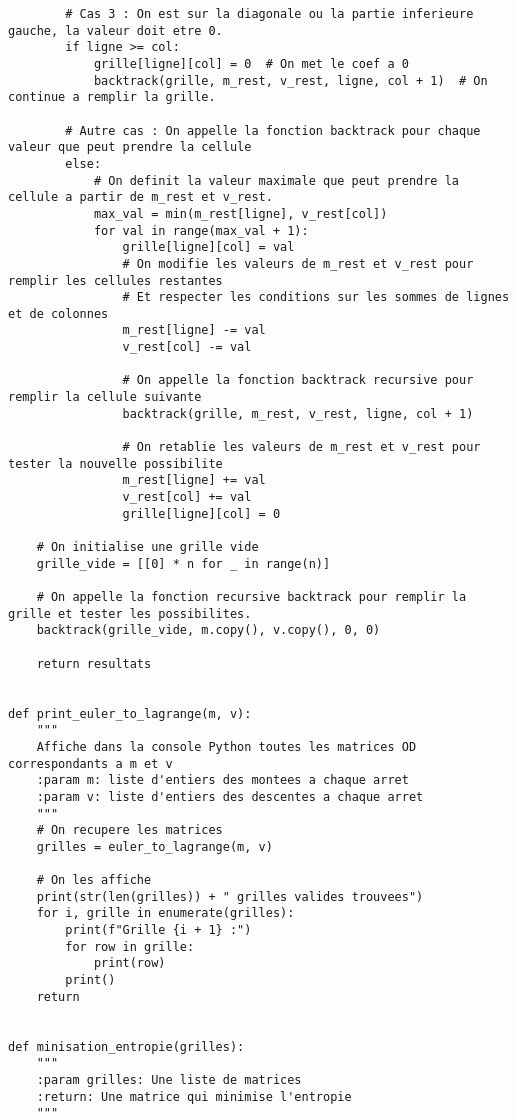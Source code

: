 \documentclass[12pt]{article}
\begin{document}
\begin{lstlisting}
        # Cas 3 : On est sur la diagonale ou la partie inferieure gauche, la valeur doit etre 0.
        if ligne >= col:
            grille[ligne][col] = 0  # On met le coef a 0
            backtrack(grille, m_rest, v_rest, ligne, col + 1)  # On continue a remplir la grille.

        # Autre cas : On appelle la fonction backtrack pour chaque valeur que peut prendre la cellule
        else:
            # On definit la valeur maximale que peut prendre la cellule a partir de m_rest et v_rest.
            max_val = min(m_rest[ligne], v_rest[col])
            for val in range(max_val + 1):
                grille[ligne][col] = val
                # On modifie les valeurs de m_rest et v_rest pour remplir les cellules restantes
                # Et respecter les conditions sur les sommes de lignes et de colonnes
                m_rest[ligne] -= val
                v_rest[col] -= val

                # On appelle la fonction backtrack recursive pour remplir la cellule suivante
                backtrack(grille, m_rest, v_rest, ligne, col + 1)

                # On retablie les valeurs de m_rest et v_rest pour tester la nouvelle possibilite
                m_rest[ligne] += val
                v_rest[col] += val
                grille[ligne][col] = 0

    # On initialise une grille vide
    grille_vide = [[0] * n for _ in range(n)]

    # On appelle la fonction recursive backtrack pour remplir la grille et tester les possibilites.
    backtrack(grille_vide, m.copy(), v.copy(), 0, 0)

    return resultats


def print_euler_to_lagrange(m, v):
    """
    Affiche dans la console Python toutes les matrices OD correspondants a m et v
    :param m: liste d'entiers des montees a chaque arret
    :param v: liste d'entiers des descentes a chaque arret
    """
    # On recupere les matrices
    grilles = euler_to_lagrange(m, v)

    # On les affiche
    print(str(len(grilles)) + " grilles valides trouvees")
    for i, grille in enumerate(grilles):
        print(f"Grille {i + 1} :")
        for row in grille:
            print(row)
        print()
    return


def minisation_entropie(grilles):
    """
    :param grilles: Une liste de matrices
    :return: Une matrice qui minimise l'entropie
    """


\end{lstlisting}
\end{document}
